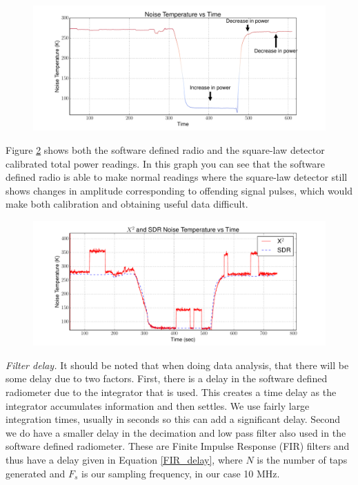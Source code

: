 \begin{figure}[h!tb] \centering
\includegraphics[width=\textwidth]{Experiments/Exp4/calib_filtered.pdf}
\label{sdr_calib_filter}
\end{figure}

Figure \ref{filter_on} shows both the software defined radio and the square-law detector calibrated total power readings.  In this graph you can see that the software defined radio is able to make normal readings where the square-law detector still shows changes in amplitude corresponding to offending signal pulses, which would make both calibration and obtaining useful data difficult.

\begin{figure}[h!tb] \centering
\includegraphics[width=\textwidth]{Experiments/Exp4/calib_filtered_both.pdf}
\label{filter_on}
\end{figure}

\emph{Filter delay.}  It should be noted that when doing data analysis, that there will be some delay due to two factors.  First, there is a delay in the software defined radiometer due to the integrator that is used.  This creates a time delay as the integrator accumulates information and then settles.  We use fairly large integration times, usually in seconds so this can add a significant delay.  Second we do have a smaller delay in the decimation and low pass filter also used in the software defined radiometer.  These are Finite Impulse Response (FIR) filters and thus have a delay given in Equation \ref{FIR_delay}, where $N$ is the number of taps generated and $F_{s}$ is our sampling frequency, in our case 10 MHz.

